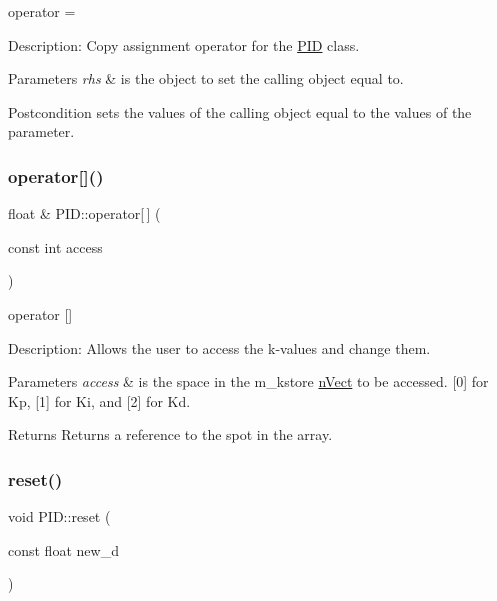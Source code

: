 operator = 

Description\+: Copy assignment operator for the \hyperlink{classPID}{P\+ID} class. 
\begin{DoxyParams}{Parameters}
{\em rhs} & is the object to set the calling object equal to. \\
\hline
\end{DoxyParams}
\begin{DoxyPostcond}{Postcondition}
sets the values of the calling object equal to the values of the parameter. 
\end{DoxyPostcond}
\mbox{\label{classPID_a1994e0891dc1054a4ba99be45bce68c0}} 
\subsubsection{\texorpdfstring{operator[]()}{operator[]()}}
{\footnotesize\ttfamily float \& P\+I\+D\+::operator\mbox{[}$\,$\mbox{]} (\begin{DoxyParamCaption}\item[{const int}]{access }\end{DoxyParamCaption})}



operator \mbox{[}\mbox{]} 

Description\+: Allows the user to access the k-\/values and change them. 
\begin{DoxyParams}{Parameters}
{\em access} & is the space in the m\+\_\+kstore \hyperlink{classnVect}{n\+Vect} to be accessed. \mbox{[}0\mbox{]} for Kp, \mbox{[}1\mbox{]} for Ki, and \mbox{[}2\mbox{]} for Kd. \\
\hline
\end{DoxyParams}
\begin{DoxyReturn}{Returns}
Returns a reference to the spot in the array. 
\end{DoxyReturn}
\mbox{\label{classPID_a87b5447cef6364adc24f34f57fc1e976}} 
\subsubsection{\texorpdfstring{reset()}{reset()}}
{\footnotesize\ttfamily void P\+I\+D\+::reset (\begin{DoxyParamCaption}\item[{const float}]{new\+\_\+d }\end{DoxyParamCaption})}



